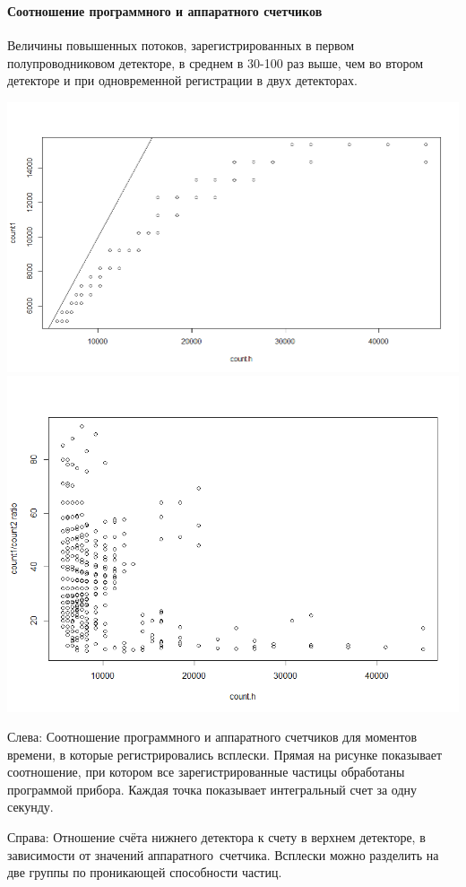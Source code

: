 \documentclass[t, aspectratio=43]{beamer}
\begin{document}
\begin{frame}	
\frametitle{\insertsection} 
\framesubtitle{Соотношение программного и аппаратного счетчиков}
{\tiny Величины повышенных потоков, зарегистрированных в первом полупроводниковом детекторе, в среднем в 30-100 раз выше, чем во втором детекторе и при одновременной регистрации в двух детекторах.}

\centering


\begin{center}
	\includegraphics[width=0.55\linewidth]{images/Rplot04}
	\includegraphics[width=0.45\linewidth]{images/Rplot11}
\end{center}
\tiny{Слева: Соотношение программного и аппаратного счетчиков для моментов времени, в которые регистрировались всплески. Прямая на рисунке показывает соотношение, при котором все зарегистрированные частицы обработаны программой прибора. Каждая точка показывает интегральный счет за одну секунду.}

{\tiny Справа: Отношение счёта нижнего детектора к счету в верхнем детекторе, в зависимости от значений аппаратного~счетчика. Всплески можно разделить на две группы по проникающей способности частиц.
}


\end{frame}
\end{document}
